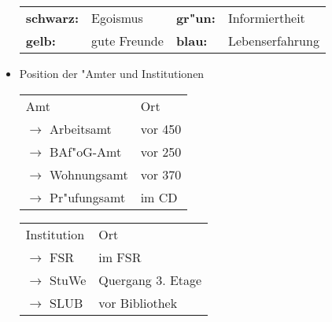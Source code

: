 \documentclass[a4paper, 10pt]{report}
\begin{document}
\begin{itemize}
  \begin{tabular}{lp{5.9cm}ll}
    \textbf{schwarz:} & Egoismus & \textbf{gr"un:} & Informiertheit \\
    \textbf{gelb:} & gute Freunde & \textbf{blau:} & Lebenserfahrung \\
  \end{tabular}

\newpage

\item Position der "Amter und Institutionen

  \begin{tabular}{ll}
    Amt & Ort \\
    $\rightarrow$ Arbeitsamt & vor 450 \\
    $\rightarrow$ BAf"oG-Amt & vor 250 \\
    $\rightarrow$ Wohnungsamt & vor 370 \\
    $\rightarrow$ Pr"ufungsamt & im CD \\
  \end{tabular}

  \begin{tabular}{ll}
    Institution \hspace{0.85cm} & Ort \\
    $\rightarrow$ FSR & im FSR \\
    $\rightarrow$ StuWe & Quergang 3. Etage \\
    $\rightarrow$ SLUB & vor Bibliothek \\
  \end{tabular}

\end{itemize}
\end{document}
